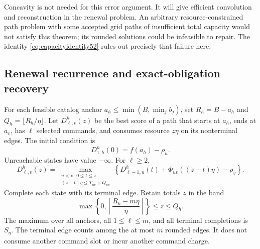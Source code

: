 \documentclass[11pt,letterpaper]{article}
\theoremstyle{definition}\newtheorem{remark}[theorem]{Remark}
\begin{document}
Concavity is not needed for this error argument. It will give efficient convolution and reconstruction in the renewal problem. An arbitrary resource-constrained path problem with some accepted grid paths of insufficient total capacity would not satisfy this theorem; its rounded solutions could be infeasible to repair. The identity \eqref{eq:capacityidentity52} rules out precisely that failure here.

\subsection{Renewal recurrence and exact-obligation recovery}
For each feasible catalog anchor $a_h\leq\min(B,\min_jb_j)$, set $R_h=B-a_h$ and $Q_h=\lfloor R_h/\eta\rfloor$. Let $D^{h}_{\ell,v}(z)$ be the best score of a path that starts at $a_h$, ends at $a_v$, has $\ell$ selected commands, and consumes resource $z\eta$ on its nonterminal edges. The initial condition is
\[
 D^h_{1,h}(0)=f(a_h)-\rho_h.
\]
Unreachable states have value $-\infty$. For $\ell\geq2$,
\begin{equation}\label{eq:dp52}
 D^h_{\ell,v}(z)=\max_{\substack{u<v,\ 0\leq t\leq z\\(z-t)\eta\leq T_{uv}+Q_{uv}}}
 \left\{D^h_{\ell-1,u}(t)+\Phi_{uv}((z-t)\eta)-\rho_v\right\}.
\end{equation}
Complete each state with its terminal edge. Retain totals $z$ in the band
\begin{equation}\label{eq:renewalband52}
 \max\left\{0,\left\lceil\frac{R_h-m\eta}{\eta}\right\rceil\right\}\leq z\leq Q_h.
\end{equation}
The maximum over all anchors, all $1\leq\ell\leq m$, and all terminal completions is $S_\eta$. The terminal edge counts among the at most $m$ rounded edges. It does not consume another command slot or incur another command charge.
\end{document}
